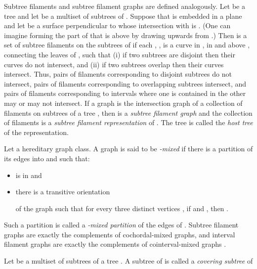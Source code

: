 \documentclass[
final
]{dmtcs-episciences}        \usepackage{graphics, amsthm, amsmath, amssymb, algorithm, algorithmic}
\begin{document}
Subtree filaments and subtree filament graphs are defined analogously.
Let  be a tree and let  be a multiset of subtrees of . Suppose that  is embedded in a plane  and let  be a surface perpendicular to  whose intersection with  is . 
(One can imagine forming the part of  that is above  by drawing  upwards from .)
Then  is a set of subtree filaments on the subtrees of  if
each , , is a curve in , in and above , connecting the leaves of , such that 
(i) if two subtrees are disjoint then their curves do not intersect, and
(ii) if two subtrees overlap then their curves intersect.
Thus, pairs of filaments corresponding to disjoint subtrees do not intersect, pairs of filaments corresponding to overlapping subtrees intersect, and 
pairs of filaments corresponding to intervals where one is contained in the other may or may not intersect.
If a graph  is the intersection graph of a collection of filaments on subtrees of a tree , then  is a {\em subtree filament graph} and the collection of filaments is a {\em subtree filament representation} of . The tree  is called the {\em host tree} of the representation. 

Let  a hereditary graph class. A graph  is said to be {\em -mixed} if there is a partition of its edges into  and  such that:
\begin{itemize}
 \item  is in  and 
 \item there is a transitive orientation 
 
 of the graph  such that
 for every three distinct vertices , if
       and , then .
 \end{itemize}
Such a partition is called a {\em -mixed partition} of the edges of .
Subtree filament graphs are exactly the complements of cochordal-mixed graphs, and interval filament graphs are exactly the complements of cointerval-mixed graphs \cite{gavril2000}.
 
Let  be a multiset of subtrees of a tree .
A subtree  of  is called
a {\em covering subtree} of 
 
\end{document}
